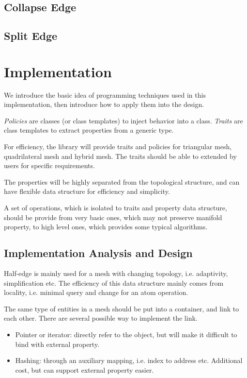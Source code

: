 \documentclass[9pt,twocolumn]{extarticle}
\begin{document}


\subsection{Collapse Edge}



\subsection{Split Edge}


\section{Implementation}
We introduce the basic idea of programming techniques used in this
implementation, then introduce how to apply them into the design.

{\em Policies} are classes (or class templates) to inject behavior
into a class.  {\em Traits} are class templates to extract properties
from a generic type.

For efficiency, the library will provide traits and policies for
triangular mesh, quadrilateral mesh and hybrid mesh.  The traits
should be able to extended by users for specific requirements.

The properties will be highly separated from the topological
structure, and can have flexible data structure for efficiency and
simplicity.

A set of operations, which is isolated to traits and property data
structure, should be provide from very basic ones, which may not
preserve manifold property, to high level ones, which provides some
typical algorithms.

\subsection{Implementation Analysis and Design}

Half-edge is mainly used for a mesh with changing topology,
i.e. adaptivity, simplification etc.  The efficiency of this data
structure mainly comes from locality, i.e. minimal query and change
for an atom operation.

The same type of entities in a mesh should be put into a container,
and link to each other.  There are several possible way to implement
the link.
\begin{itemize}
\item Pointer or iterator: directly refer to the object, but will make
  it difficult to bind with external property.
\item Hashing: through an auxiliary mapping, i.e. index to address
  etc.  Additional cost, but can support external property easier.
\end{itemize}
\end{document}
